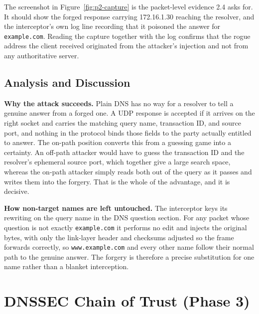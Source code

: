 \documentclass[11pt]{article}
\begin{document}
The screenshot in Figure~\ref{fig:p2-capture} is the packet-level evidence 2.4
asks for. It should show the forged response carrying 172.16.1.30 reaching the
resolver, and the interceptor's own log line recording that it poisoned the answer
for \texttt{example.com}. Reading the capture together with the log confirms that
the rogue address the client received originated from the attacker's injection and
not from any authoritative server.

\subsection{Analysis and Discussion}

\textbf{Why the attack succeeds.} Plain DNS has no way for a resolver to tell a
genuine answer from a forged one. A UDP response is accepted if it arrives on the
right socket and carries the matching query name, transaction ID, and source port,
and nothing in the protocol binds those fields to the party actually entitled to
answer. The on-path position converts this from a guessing game into a certainty.
An off-path attacker would have to guess the transaction ID and the resolver's
ephemeral source port, which together give a large search space, whereas the
on-path attacker simply reads both out of the query as it passes and writes them
into the forgery. That is the whole of the advantage, and it is decisive.

\textbf{How non-target names are left untouched.} The interceptor keys its
rewriting on the query name in the DNS question section. For any packet whose
question is not exactly \texttt{example.com} it performs no edit and injects the
original bytes, with only the link-layer header and checksums adjusted so the frame
forwards correctly, so \texttt{www.example.com} and every other name follow their
normal path to the genuine answer. The forgery is therefore a precise substitution
for one name rather than a blanket interception.


\clearpage

\section{DNSSEC Chain of Trust (Phase 3)}
\end{document}
